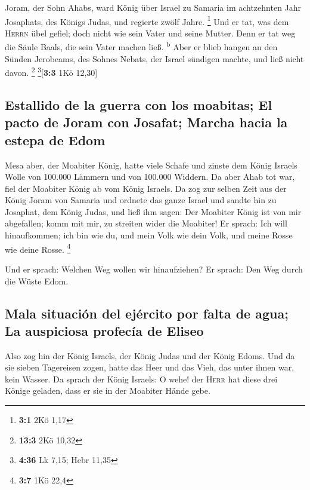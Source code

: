  Joram, der Sohn Ahabs, ward König über Israel zu Samaria
im achtzehnten Jahr Josaphats, des Königs Judas, und regierte zwölf
Jahre. \footnote{\textbf{3:1} 2Kö 1,17}  Und er tat, was
dem \textsc{Herrn} übel gefiel; doch nicht wie sein Vater und seine
Mutter. Denn er tat weg die Säule Baals, die sein Vater machen ließ.
\textsuperscript{b}  Aber er blieb hangen an den Sünden
Jerobeams, des Sohnes Nebats, der Israel sündigen machte, und ließ nicht
davon. \footnote{\textbf{13:3} 2Kö 10,32} \footnote{\textbf{4:36} Lk
  7,15; Hebr 11,35}{[}\textbf{3:3} 1Kö 12,30{]}

\hypertarget{estallido-de-la-guerra-con-los-moabitas-el-pacto-de-joram-con-josafat-marcha-hacia-la-estepa-de-edom}{%
\subsection{Estallido de la guerra con los moabitas; El pacto de Joram
con Josafat; Marcha hacia la estepa de
Edom}\label{estallido-de-la-guerra-con-los-moabitas-el-pacto-de-joram-con-josafat-marcha-hacia-la-estepa-de-edom}}

 Mesa aber, der Moabiter König, hatte viele Schafe und
zinste dem König Israels Wolle von 100.000 Lämmern und von 100.000
Widdern.  Da aber Ahab tot war, fiel der Moabiter König ab
vom König Israels.  Da zog zur selben Zeit aus der König
Joram von Samaria und ordnete das ganze Israel  und sandte
hin zu Josaphat, dem König Judas, und ließ ihm sagen: Der Moabiter König
ist von mir abgefallen; komm mit mir, zu streiten wider die Moabiter! Er
sprach: Ich will hinaufkommen; ich bin wie du, und mein Volk wie dein
Volk, und meine Rosse wie deine Rosse. \footnote{\textbf{3:7} 1Kö 22,4}

 Und er sprach: Welchen Weg wollen wir hinaufziehen? Er
sprach: Den Weg durch die Wüste Edom.

\hypertarget{mala-situaciuxf3n-del-ejuxe9rcito-por-falta-de-agua-la-auspiciosa-profecuxeda-de-eliseo}{%
\subsection{Mala situación del ejército por falta de agua; La auspiciosa
profecía de
Eliseo}\label{mala-situaciuxf3n-del-ejuxe9rcito-por-falta-de-agua-la-auspiciosa-profecuxeda-de-eliseo}}

 Also zog hin der König Israels, der König Judas und der
König Edoms. Und da sie sieben Tagereisen zogen, hatte das Heer und das
Vieh, das unter ihnen war, kein Wasser.  Da sprach der
König Israels: O wehe! der \textsc{Herr} hat diese drei Könige geladen,
dass er sie in der Moabiter Hände gebe.

